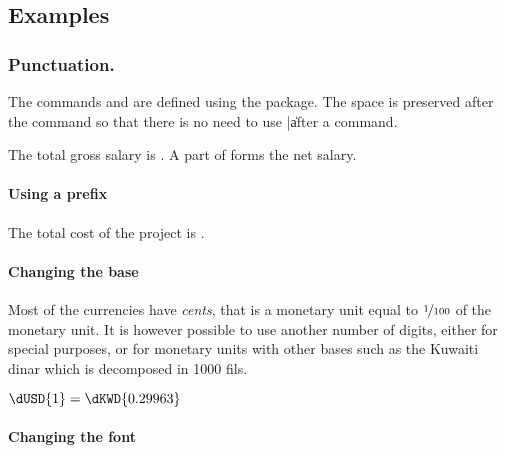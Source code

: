 \documentclass[12pt,add-index]{cnltx-doc}
\begin{document}
\subsection{Examples}

\subsubsection{Punctuation.}

The commands  and  are defined using 
the  package. The space is preserved after the command
so that there is no need to use \verbcode|\| after a command.

\begin{example}
    The total gross salary is . A part of  forms the net salary.
\end{example}

\paragraph*{Using a prefix}

\begin{example}
    The total cost of the project is .
\end{example}

\paragraph*{Changing the base}

Most of the currencies have \emph{cents}, that is a monetary unit equal to $\nicefrac{1}{100}$ 
of the monetary unit. It is however possible to use another number of digits, either 
for special purposes, or for monetary units with other bases such as the Kuwaiti dinar
which is decomposed in \num{1000} fils.

\begin{example}
    $\dUSD{1}=\dKWD{0.29963}$
\end{example}

\paragraph*{Changing the font}
\end{document}
